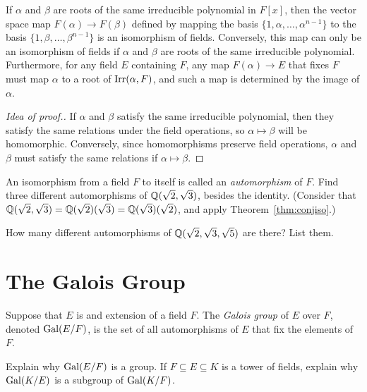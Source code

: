 \begin{theorem}\label{thm:conjiso}
If $\alpha$ and $\beta$ are roots of the same irreducible polynomial in $F[x]$, then the vector space map $F(\alpha) \longrightarrow F(\beta)$ defined by mapping the basis $\{1, \alpha, \ldots, \alpha^{n-1}\}$ to the basis $\{1, \beta, \ldots, \beta^{n-1}\}$ is an isomorphism of fields.  Conversely, this map can only be an isomorphism of fields if $\alpha$ and $\beta$ are roots of the same irreducible polynomial.  Furthermore, for any field $E$ containing $F$, any map $F(\alpha) \longrightarrow E$ that fixes $F$ must map $\alpha$ to a root of $\operatorname{Irr}(\alpha,F)$, and such a map is determined by the image of $\alpha$.
\end{theorem}

\begin{proof}[Idea of proof.] If $\alpha$ and $\beta$ satisfy the same irreducible polynomial, then they satisfy the same relations under the field operations, so $\alpha \mapsto \beta$ will be homomorphic. Conversely, since homomorphisms preserve field operations, $\alpha$ and $\beta$ must satisfy the same relations if $\alpha \mapsto \beta$.
\end{proof}

\begin{problem}
    An isomorphism from a field $F$ to itself is called an \textit{automorphism} of $F$. Find three different automorphisms of $\mathbb{Q}(\sqrt{2},\sqrt{3})$, besides the identity. (Consider that $\mathbb{Q}(\sqrt{2},\sqrt{3})=\mathbb{Q}(\sqrt{2})(\sqrt{3})=\mathbb{Q}(\sqrt{3})(\sqrt{2})$, and apply Theorem~\ref{thm:conjiso}.)
\end{problem}



\begin{problem}
    How many different automorphisms of $\mathbb{Q}(\sqrt{2},\sqrt{3},\sqrt{5})$ are there? List them.
\end{problem}

\section{The Galois Group}

\begin{definition}
    Suppose that $E$ is and extension of a field $F$. The \textit{Galois group} of $E$ over $F$, denoted $\operatorname{Gal}(E/F)$, is the set of all automorphisms of $E$ that fix the elements of $F$.
\end{definition}

\begin{problem}
    Explain why $\operatorname{Gal}(E/F)$ is a group. If $F\subseteq E\subseteq K$ is a tower of fields, explain why $\operatorname{Gal}(K/E)$ is a subgroup of $\operatorname{Gal}(K/F)$.
\end{problem}



